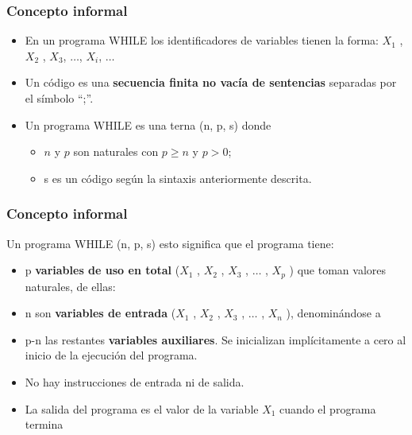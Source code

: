 \documentclass[xcolor=table]{beamer}
\begin{document}
\begin{frame}[fragile]\frametitle{Concepto informal} \small  

\begin{itemize}
    \item En un programa WHILE los identificadores de variables tienen la forma: $X_1$ , $X_2$ , $X_3$, $\ldots$, $X_i$, $\ldots$
  \item  Un código es una \textbf{secuencia finita no vacía de sentencias} separadas por el símbolo ``;''.
  \item  Un programa WHILE es una terna (n, p, s) donde

  \begin{itemize}
    \item  $n$ y $p$ son naturales con $p \geq n$ y $p > 0$;
    \item s es un código según la sintaxis anteriormente descrita.

\end{itemize}

\end{itemize}
\end{frame}


\begin{frame}[fragile]\frametitle{Concepto informal} \small  

Un programa WHILE (n, p, s) esto significa que el programa tiene:


\begin{itemize}
    \item p \textbf{variables de uso en total} ($X_1$ , $X_2$ , $X_3$ , $\ldots$ , $X_p$ ) que toman valores naturales, de ellas:
    \item n son \textbf{variables de entrada} ($X_1$ , $X_2$ , $X_3$  , $\ldots$ , $X_n$ ), denominándose a
    \item p-n las restantes \textbf{variables auxiliares}. Se inicializan implícitamente a cero al inicio de la ejecución del programa.
    \item No hay instrucciones de entrada ni de salida.
    \item La salida del programa es el valor de la variable $X_1$ cuando el programa termina
\end{itemize}
\end{frame}
\end{document}

